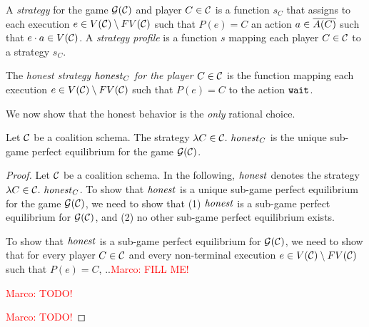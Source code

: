 %
A \textit{strategy} for the game $\mathcal{G}(\mathcal{C})$ and player $C \in \mathcal{C}$ is a function $s_C$ that assigns to each execution $e \in V(\mathcal{C}) \setminus FV(\mathcal{C})$ such that $P(e) = C$ an action $a \in \overline{A(C)}$ such that $e \cdot a \in V(\mathcal{C})$.
%
A \textit{strategy profile} is a function $s$ mapping each player $C \in \mathcal{C}$ to a strategy $s_C$. 

The \textit{honest strategy $\mathit{honest}_C$ for the player $C \in \mathcal{C}$} is the function mapping each execution $e \in V(\mathcal{C}) \setminus FV(\mathcal{C})$ such that $P(e) = C$ to the action $\mathtt{wait}$.


%
We now show that the honest behavior is the \textit{only} rational choice.

\begin{theorem}
Let $\mathcal{C}$ be a coalition schema.
%
The strategy $\lambda C \in \coalitionSchema.\ \honest_C$ is the unique sub-game perfect equilibrium for the game $\mathcal{G}(\mathcal{C})$.
\end{theorem}

\begin{proof}
Let $\mathcal{C}$ be a coalition schema.
%
In the following, $\mathit{honest}$ denotes the strategy $\lambda C \in \coalitionSchema.\ \honest_C$.
%
To show that $\mathit{honest}$ is a unique sub-game perfect equilibrium for the game $\mathcal{G}(\mathcal{C})$, we need to show that (1) $\mathit{honest}$ is a sub-game perfect equilibrium for $\mathcal{G}(\mathcal{C})$, and (2) no other sub-game perfect equilibrium exists.

%
To show that $\mathit{honest}$ is a sub-game perfect equilibrium for $\mathcal{G}(\mathcal{C})$, we need to show that for every player $C \in \mathcal{C}$ and every non-terminal execution $e \in V(\mathcal{C}) \setminus FV(\mathcal{C})$ such that $P(e) = C$, ..\textcolor{red}{Marco: FILL ME!}	

\textcolor{red}{Marco: TODO!}	


\textcolor{red}{Marco: TODO!}	
\end{proof}




